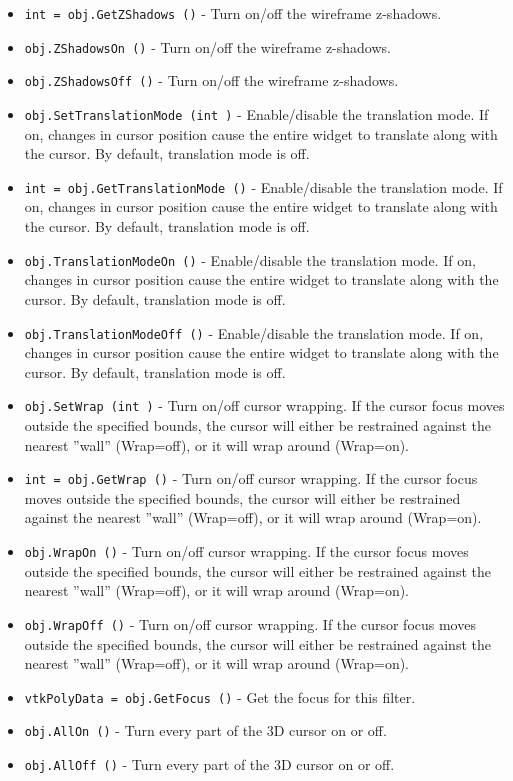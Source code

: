 \begin{itemize}
\item  \verb|int = obj.GetZShadows ()| -  Turn on/off the wireframe z-shadows.

\item  \verb|obj.ZShadowsOn ()| -  Turn on/off the wireframe z-shadows.

\item  \verb|obj.ZShadowsOff ()| -  Turn on/off the wireframe z-shadows.

\item  \verb|obj.SetTranslationMode (int )| -  Enable/disable the translation mode. If on, changes in cursor position
 cause the entire widget to translate along with the cursor.
 By default, translation mode is off.

\item  \verb|int = obj.GetTranslationMode ()| -  Enable/disable the translation mode. If on, changes in cursor position
 cause the entire widget to translate along with the cursor.
 By default, translation mode is off.

\item  \verb|obj.TranslationModeOn ()| -  Enable/disable the translation mode. If on, changes in cursor position
 cause the entire widget to translate along with the cursor.
 By default, translation mode is off.

\item  \verb|obj.TranslationModeOff ()| -  Enable/disable the translation mode. If on, changes in cursor position
 cause the entire widget to translate along with the cursor.
 By default, translation mode is off.

\item  \verb|obj.SetWrap (int )| -  Turn on/off cursor wrapping. If the cursor focus moves outside the
 specified bounds, the cursor will either be restrained against the
 nearest ''wall'' (Wrap=off), or it will wrap around (Wrap=on).

\item  \verb|int = obj.GetWrap ()| -  Turn on/off cursor wrapping. If the cursor focus moves outside the
 specified bounds, the cursor will either be restrained against the
 nearest ''wall'' (Wrap=off), or it will wrap around (Wrap=on).

\item  \verb|obj.WrapOn ()| -  Turn on/off cursor wrapping. If the cursor focus moves outside the
 specified bounds, the cursor will either be restrained against the
 nearest ''wall'' (Wrap=off), or it will wrap around (Wrap=on).

\item  \verb|obj.WrapOff ()| -  Turn on/off cursor wrapping. If the cursor focus moves outside the
 specified bounds, the cursor will either be restrained against the
 nearest ''wall'' (Wrap=off), or it will wrap around (Wrap=on).

\item  \verb|vtkPolyData = obj.GetFocus ()| -  Get the focus for this filter.

\item  \verb|obj.AllOn ()| -  Turn every part of the 3D cursor on or off.

\item  \verb|obj.AllOff ()| -  Turn every part of the 3D cursor on or off.

\end{itemize}
